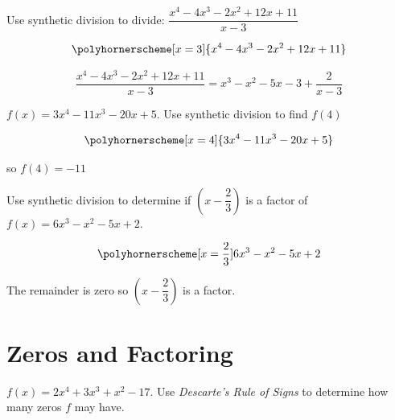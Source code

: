 \documentclass[fleqn,addpoints]{exam}
\begin{document}
\begin{questions}

\question[5]
Use synthetic division to divide: $\dfrac{x^4-4x^3-2x^2+12x+11}{x-3}$

\begin{solution}[5 cm]
\[
  \polyhornerscheme[x=3]{x^4-4x^3-2x^2+12x+11}
\]

\[
  \dfrac{x^4-4x^3-2x^2+12x+11}{x-3} = x^3-x^2-5x-3 + \frac{2}{x-3}
\]
\end{solution}
 
\question[5]
$f(x) = 3x^4 -11x^3 - 20x + 5$.  Use synthetic division to find $f(4)$

\begin{solution}[6 cm]
\[
  \polyhornerscheme[x=4]{3x^4 -11x^3 - 20x + 5}
\]

so $f(4) = -11$

\end{solution}

\question[5]
Use synthetic division to determine if $\left(x-\dfrac{2}{3} \right)$ is a factor of $f(x) = 6x^3-x^2-5x+2$.

\begin{solution}[6 cm]
\[
  \polyhornerscheme[x=\frac{2}{3}]{6x^3-x^2-5x+2}
\]

The remainder is zero so $\left(x-\dfrac{2}{3} \right)$ is a factor.

\end{solution}
 
\section{Zeros and Factoring}

\question
$f(x) = 2x^4 + 3x^3 + x^2 - 17$.  Use {\em Descarte's Rule of Signs} to determine how many zeros $f$ may have.

\end{questions}
\end{document}
